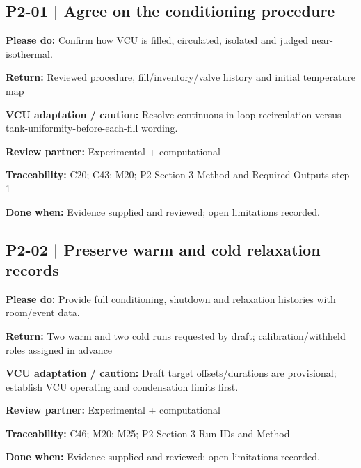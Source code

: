 \documentclass[11pt]{article}
\begin{document}
\begin{minipage}{\textwidth}\small\setlength{\parskip}{2pt}
\subsection*{P2-01 | Agree on the conditioning procedure}
\textbf{Please do:} Confirm how VCU is filled, circulated, isolated and judged near-isothermal.\par
\textbf{Return:} Reviewed procedure, fill/inventory/valve history and initial temperature map\par
\textbf{VCU adaptation / caution:} Resolve continuous in-loop recirculation versus tank-uniformity-before-each-fill wording.\par
\textbf{Review partner:} Experimental + computational\par
\textbf{Traceability:} C20; C43; M20; P2 Section 3 Method and Required Outputs step 1\par
\textbf{Done when:} Evidence supplied and reviewed; open limitations recorded.\par
\end{minipage}\par\vspace{8pt}
\begin{minipage}{\textwidth}\small\setlength{\parskip}{2pt}
\subsection*{P2-02 | Preserve warm and cold relaxation records}
\textbf{Please do:} Provide full conditioning, shutdown and relaxation histories with room/event data.\par
\textbf{Return:} Two warm and two cold runs requested by draft; calibration/withheld roles assigned in advance\par
\textbf{VCU adaptation / caution:} Draft target offsets/durations are provisional; establish VCU operating and condensation limits first.\par
\textbf{Review partner:} Experimental + computational\par
\textbf{Traceability:} C46; M20; M25; P2 Section 3 Run IDs and Method\par
\textbf{Done when:} Evidence supplied and reviewed; open limitations recorded.\par
\end{minipage}\par\vspace{8pt}
\end{document}
